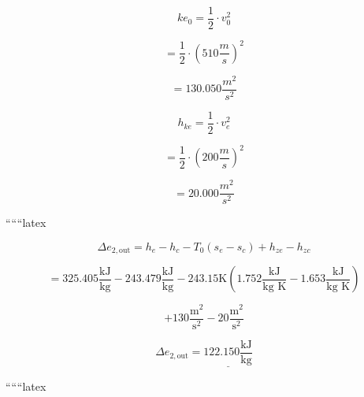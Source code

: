 \[
ke_0 = \frac{1}{2} \cdot v_0^2
\]

\[
= \frac{1}{2} \cdot (510 \frac{m}{s})^2
\]

\[
= 130.050 \frac{m^2}{s^2}
\]

\[
h_{ke} = \frac{1}{2} \cdot v_e^2
\]

\[
= \frac{1}{2} \cdot (200 \frac{m}{s})^2
\]

\[
= 20.000 \frac{m^2}{s^2}
\]

``````latex


\[
\Delta e_{2, \text{out}} = h_e - h_c - T_0 (s_e - s_c) + h_{ze} - h_{zc}
\]

\[
= 325.405 \frac{\text{kJ}}{\text{kg}} - 243.479 \frac{\text{kJ}}{\text{kg}} - 243.15 \text{K} \left(1.752 \frac{\text{kJ}}{\text{kg K}} - 1.653 \frac{\text{kJ}}{\text{kg K}}\right)
\]

\[
+ 130 \frac{\text{m}^2}{\text{s}^2} - 20 \frac{\text{m}^2}{\text{s}^2}
\]

\[
\Delta e_{2, \text{out}} = \underline{122.150 \frac{\text{kJ}}{\text{kg}}}
\]

``````latex